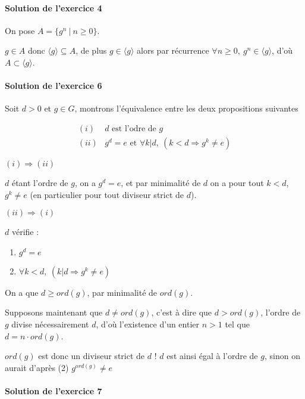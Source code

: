 \documentclass[]{article}
\theoremstyle{remark}
\theoremstyle{definition}
\newenvironment{proofpart}[1]{
	\noindent
	{\boldmath #1}
}{
	\checkmark
}
\begin{document}
\paragraph{Solution de l'exercice 4}
On pose $A = \{g^n ~ | ~ n \geqslant 0\}$.

$g \in A$ donc $\langle g \rangle \subseteq A$, de plus $g \in \langle g \rangle$ alors par récurrence $\forall n \geqslant 0, ~ g^n \in \langle g \rangle$, d'où $A \subset \langle g \rangle$.

\paragraph{Solution de l'exercice 6}

Soit $d > 0$ et $g \in G$, montrons l'équivalence entre les deux propositions suivantes

$$
\begin{array}{ll}
	(i) & d \text{ est l'odre de } g \\
	(ii) & g^d=e \text{ et } \forall k | d, ~ (k < d \Longrightarrow g^k \neq e)
\end{array}
$$

\noindent
\begin{proofpart}{$(i) \Longrightarrow (ii)$}

	$d$ étant l'ordre de $g$, on a $g^d=e$, et par minimalité de $d$ on a pour tout $k < d$, $g^k \neq e$ (en particulier pour tout diviseur strict de $d$).
\end{proofpart}

\begin{proofpart}{$(ii) \Longrightarrow (i)$}

	$d$ vérifie :
	\begin{enumerate}
		\item $g^d=e$
		\item $\forall k < d, ~ (k | d \Longrightarrow g^k \neq e)$
	\end{enumerate}
	
	On a que $d \geqslant ord(g)$, par minimalité de $ord(g)$.
	
	Supposons maintenant que $d \neq ord(g)$, c'est à dire que $d > ord(g)$, l'ordre de $g$ divise nécessairement $d$, d'où l'existence d'un entier $n > 1$ tel que $d= n \cdot ord(g)$.
	
	$ord(g)$ est donc un diviseur strict de $d$ ! $d$ est ainsi égal à l'ordre de $g$, sinon on aurait d'après (2) $g^{ord(g)} \neq e$
\end{proofpart}

\paragraph{Solution de l'exercice 7}
\end{document}

